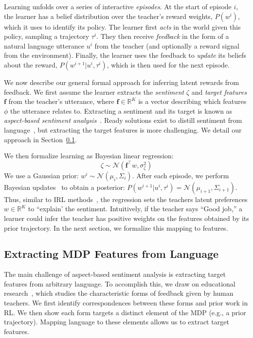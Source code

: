 \documentclass[letterpaper]{article} %
\begin{document}
Learning unfolds over a series of interactive \textit{episodes}.
At the start of episode $i$, the learner has a belief distribution over the teacher's reward weights, $P(w^{i})$, which it uses to identify its policy.
The learner first \emph{acts} in the world given this policy, sampling a trajectory $\tau^i$.
They then receive \emph{feedback} in the form of a natural language utterance $u^i$ from the teacher (and optionally a reward signal from the environment). Finally, the learner uses the feedback to \emph{update} its beliefs about the reward, $P(w^{i+1} | u^i, \tau^i)$, which is then used for the next episode.

We now describe our general formal approach for inferring latent rewards from feedback. We first assume the learner extracts the \textit{sentiment} $\zeta$ and \textit{target features} $\mathbf{f}$ from the teacher's utterance, where $\mathbf{f} \in \mathbb{R}^K$ is a vector describing which features $\phi$ the utterance relates to. Extracting a sentiment and its target is known as \textit{aspect-based sentiment analysis}~\cite{liu2020sentiment}. Ready solutions exist to distill sentiment from  language~\cite{HuttoG14, Kim_2014}, but extracting the target features is more challenging. We detail our approach in Section~\ref{forms_of_feedback_section}.

We then formalize learning as Bayesian linear regression:
\begin{equation}
\zeta \sim \mathcal{N}(\mathbf{f}^{\top} w, \sigma_\zeta^2)
\label{bayesian_lr_equation}
\end{equation}
We use a Gaussian prior: $w^i \sim \mathcal{N}(\mu_i, \Sigma_i)$. After each episode, we perform Bayesian updates~\cite{murphy_2007} to obtain a posterior: $P(w^{i+1} | u^i, \tau^i) = \mathcal{N}(\mu_{i+1},\Sigma_{i+1})$. Thus, similar to IRL methods~\citep{ramachandran2007bayesian}, the regression sets the teachers latent preferences $w \in \mathbb{R}^K$ to ``explain' the sentiment. Intuitively, if the teacher says ``Good job,'' a learner could infer the teacher has positive weights on the features obtained by its prior trajectory. In the next section, we formalize this mapping to features.

\subsection{Extracting MDP Features from Language}
\label{forms_of_feedback_section}
The main challenge of aspect-based sentiment analysis is extracting target features from arbitrary language. To accomplish this, we draw on educational research~\citep{Lipnevich_education, shute_2008}, which studies the characteristic forms of feedback given by human teachers. We first identify correspondences between these forms and prior work in RL. We then show each form targets a distinct element of the MDP (e.g., a prior trajectory). Mapping language to these elements allows us to extract target features.
\end{document}
